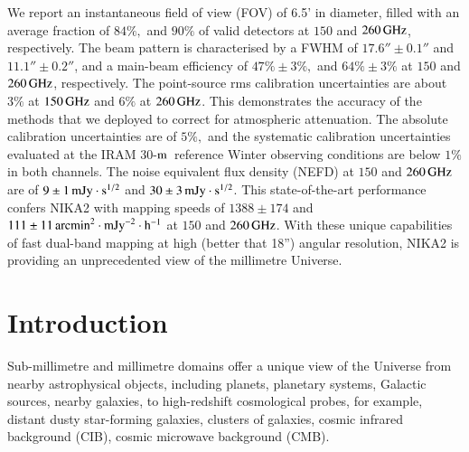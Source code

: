 \documentclass[traditionalabstract]{aa}
\newcommand{\trentemetre}{30-$\rm{m}$}
\newcommand{\lp}[1]{#1}
\newcommand{\rev}[1]{#1}
\newcommand{\LEt}[1]{{\bf {\color[RGB]{0, 153, 255} #1}}}
\begin{document}
       {We report an instantaneous field of view (FOV) of 6.5'
         in diameter, filled with an average fraction of $84\%,$ and 
         $90\%$ of %
         valid detectors
         at $150$ and $260\,\rm{GHz}$, respectively. The beam pattern
         is characterised by a FWHM of $17.6'' \pm 0.1''$
         and  $11.1''\pm 0.2''$, and a main-beam efficiency of
         {\rev $47\% \pm 3\%,$} and {\rev $64\% \pm 3\%$}
         at $150$ and $260\,\rm{GHz}$, respectively.
         The {\rev point-source} rms calibration uncertainties are about $3\%$ at $150\,\rm{GHz}$ 
         and $6\%$ at $260\,\rm{GHz}$. This demonstrates
         the accuracy of the methods that we deployed to correct
         for atmospheric attenuation.
         {\lp The absolute
           calibration uncertainties are of $5\%,$ and the systematic
           calibration uncertainties evaluated at the IRAM
           \trentemetre\ reference Winter observing conditions are
           below $1\%$ in both channels.}
         The noise equivalent
         flux density (NEFD) at $150$ and $260\,\rm{GHz}$ are of
         $9 \pm 1\, \rm{mJy}\cdot s^{1/2}$ and
         $30 \pm 3\, \rm{mJy}\cdot s^{1/2}$. 
         This state-of-the-art performance confers NIKA2 with
         mapping speeds of $1388 \pm 174$ and
         $111 \pm 11 \, \rm{arcmin}^2\cdot \rm{mJy}^{-2}\cdot
         \rm{h}^{-1}$
         at $150$ and $260\,\rm{GHz}$.}
       {With these unique capabilities of fast dual-band mapping at
         high (better that 18'') angular resolution, NIKA2 is providing an unprecedented view
         of the millimetre Universe.}      
       
   \maketitle
\section{Introduction}
\label{se:intro}
%
Sub-millimetre and millimetre domains offer a unique view of the
Universe from nearby astrophysical objects, including planets,
planetary systems, Galactic sources, %
nearby galaxies, to high-redshift
cosmological probes, for example, distant dusty star-forming galaxies,
clusters of galaxies, cosmic infrared background (CIB), cosmic microwave
background (CMB).
\end{document}
